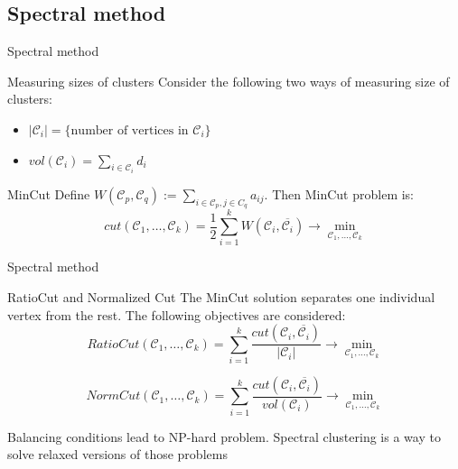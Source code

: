 \documentclass{beamer}
\theoremstyle{definition}
\theoremstyle{plain}
\theoremstyle{remark}
\begin{document}
		\subsection{Spectral method}
			\begin{frame}{Spectral method}
				\begin{block}{Measuring sizes of clusters}
					Consider the following two ways of measuring size of clusters:
					\begin{itemize}
						\item $|\mathcal{C}_{i}| = \{\text{number of vertices in $\mathcal{C}_{i}$}\}$
						\item $vol(\mathcal{C}_{i}) = \sum \limits_{i \in \mathcal{C}_{i}}d_{i}$
					\end{itemize}
				\end{block}
				\begin{block}{MinCut}
					Define $W(\mathcal{C}_p,\mathcal{C}_q):= \sum \limits_{i \in \mathcal{C}_p,j \in C_q}  a_{ij}.$ Then MinCut problem is:
\[
cut(\mathcal{C}_1,\dots,\mathcal{C}_k) = \frac{1}{2}\sum\limits_{i=1}^kW(\mathcal{C}_i,\overline{\mathcal{C}_i}) \rightarrow \min \limits_{\mathcal{C}_1,\dots,\mathcal{C}_k}
\]
				\end{block}
			\end{frame}		
		\begin{frame}{Spectral method}
				\begin{block}{RatioCut and Normalized Cut}
					The MinCut solution separates one individual vertex from the rest. The following objectives are considered:
\[
RatioCut(\mathcal{C}_1,\dots,\mathcal{C}_k) = \sum \limits_{i=1}^k \frac{cut(\mathcal{C}_i,\overline{\mathcal{C}_i})}{|\mathcal{C}_{i}|} \rightarrow \min \limits_{\mathcal{C}_1,\dots,\mathcal{C}_k}
\]

\[
NormCut(\mathcal{C}_1,\dots,\mathcal{C}_k)= \sum \limits_{i=1}^k \frac{cut(\mathcal{C}_i,\overline{\mathcal{C}_i})}{vol(\mathcal{C}_{i})} \rightarrow \min \limits_{\mathcal{C}_1,\dots,\mathcal{C}_k}
\]
			\end{block}
				Balancing conditions lead to NP-hard problem. Spectral clustering is a way to solve relaxed versions of those problems
			\end{frame}
\end{document}
